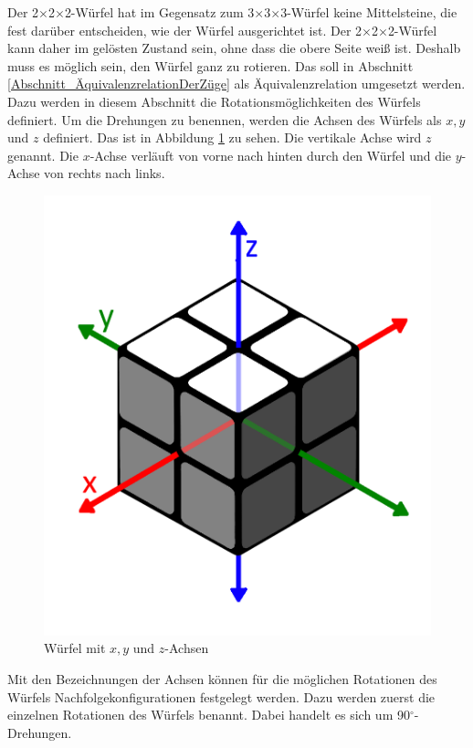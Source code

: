 \documentclass[12pt,a4paper, usenames, dvipsnames]{article}
\theoremstyle{mystyle}
\theoremstyle{definition}
\newcommand{\Ttwo}{2$\times$2$\times$2-}
\newcommand{\Tthree}{3$\times$3$\times$3-}
\begin{document}
Der \Ttwo Würfel hat im Gegensatz zum \Tthree Würfel keine Mittelsteine, die fest darüber entscheiden, wie der Würfel ausgerichtet ist. 
Der \Ttwo Würfel kann daher im gelösten Zustand sein, ohne dass die obere Seite weiß ist. Deshalb muss es möglich sein, den Würfel ganz zu rotieren.
Das soll in Abschnitt \ref{Abschnitt_ÄquivalenzrelationDerZüge} als Äquivalenzrelation umgesetzt werden. Dazu werden in diesem Abschnitt die Rotationsmöglichkeiten des Würfels definiert.
Um die Drehungen zu benennen, werden die Achsen des Würfels als $x, y$ und $z$ definiert. Das ist in Abbildung \ref{Abbildung_Rotationsachsen} zu sehen. Die vertikale Achse wird $z$ genannt. Die $x$-Achse verläuft von vorne nach hinten durch den Würfel und die $y$-Achse von rechts nach links.
\begin{figure}[H]
\centering
\includegraphics[scale=0.13]{Pfeile.png}
\caption[Würfel mit $x, y$ und $z$-Achsen]{Würfel mit $x, y$ und $z$-Achsen}
\label{Abbildung_Rotationsachsen}
\end{figure} 

Mit den Bezeichnungen der Achsen können für die möglichen Rotationen des Würfels Nachfolgekonfigurationen festgelegt werden. 
Dazu werden zuerst die einzelnen Rotationen des Würfels benannt. Dabei handelt es sich um 90$^\circ$-Drehungen.
\end{document}
